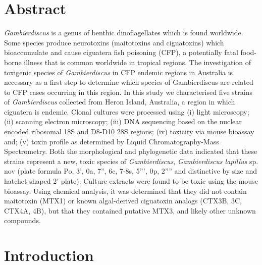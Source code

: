 \documentclass[12pt]{article}
\begin{document}
\section{Abstract}
\textit{Gambierdiscus} is a genus of benthic dinoflagellates which is found worldwide. 
Some species produce neurotoxins (maitotoxins and ciguatoxins) which  bioaccumulate and cause ciguatera fish poisoning (CFP), a potentially fatal food-borne illness that is common worldwide in tropical regions. 
The investigation of toxigenic species of \textit{Gambierdiscus} in CFP endemic regions in Australia is necessary as a first step to determine which species of Gambierdiscus are related to CFP cases occurring in this region.
In this study we characterised five strains of \textit{Gambierdiscus} collected from Heron Island,  Australia, a region in which ciguatera is endemic. Clonal cultures were processed using (i) light microscopy; (ii) scanning electron microscopy; (iii) DNA sequencing based on the nuclear encoded ribosomal  18S and D8-D10 28S regions; (iv) toxicity via mouse bioassay and; (v) toxin profile as determined by Liquid Chromatography-Mass Spectrometry. 
Both the morphological and phylogenetic data indicated that these strains represent a new, toxic species of \emph{Gambierdiscus}, \emph{Gambierdiscus lapillus} sp. nov (plate formula Po, 3', 0a, 7'', 6c, 7-8s, 5''', 0p, 2'''' and distinctive by size and hatchet shaped 2' plate). Culture extracts were found to be toxic using the mouse bioassay. Using chemical analysis, it was determined that they did not contain maitotoxin (MTX1) or known algal-derived ciguatoxin analogs (CTX3B, 3C, CTX4A, 4B), but that they contained putative MTX3, and likely other unknown compounds.

\newpage

\section{Introduction}
\end{document}
